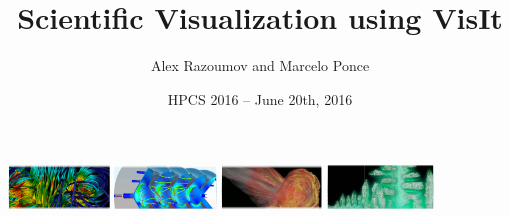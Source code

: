 \documentclass[xcolor=svgnames]{beamer}
\begin{document}
\title[VisIt Workshop]{\Large\bf Scientific Visualization using VisIt}
\author[\textbf{A.Razoumov} \& \textbf{M.Ponce}]{\Large {\sc Alex Razoumov} and {\sc Marcelo Ponce}}
\date[HPCS 2016]{HPCS 2016 -- June 20th, 2016}

\begin{frame}
  \centering
\href{https://wci.llnl.gov/simulation/computer-codes/visit/}{\includegraphics[height=1.15cm]{./figs/visit-logos/VisIt-01}} \href{https://wci.llnl.gov/simulation/computer-codes/visit/}{\includegraphics[height=1.15cm]{./figs/visit-logos/VisIt-02}} \href{https://wci.llnl.gov/simulation/computer-codes/visit/}{\includegraphics[height=1.15cm]{./figs/visit-logos/VisIt-03}} \href{https://wci.llnl.gov/simulation/computer-codes/visit/}{\includegraphics[height=1.15cm]{./figs/visit-logos/VisIt-04}}

  \vspace{-.25cm}

  \titlepage
\end{frame}
\end{document}
